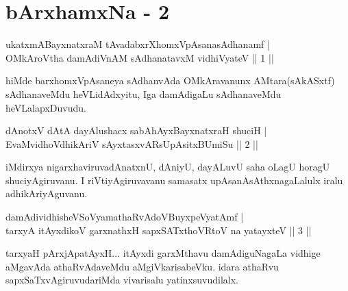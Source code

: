 
\chapter{bArxhamxNa - 2}
\begin{shl}
ukatxmABayxnatxraM tAvadabxrXhomxVpAsanasAdhanamf | \\
OMkAroV\s tha damAdiVnAM sAdhanatavxM vidhiVyateV \hfill||  1 || 
\end{shl}

\begin{artha}
hiMde barxhomxVpAsaneya sAdhanvAda OMkAravanunx AMtara(sAkASxtf) sAdhanaveMdu heVLidAdxyitu, Iga damAdigaLu sAdhanaveMdu heVLalapxDuvudu. 
\end{artha}


\begin{shl}
dAnotxV dAtA dayAlushacx sabAhAyxBayxnatxraH shuciH | \\
EvaMvidhoV\s dhikAriV sAyxtasxvARsUpAsitxBUmiSu \hfill||  2 ||
\end{shl}

\begin{artha}
iMdirxya nigarxhaviruvadAnatxnU, dAniyU, dayALuvU saha oLagU  horagU shuciyAgiruvanu. I riVtiyAgiruvavanu samasatx upAsanAsAthxnagaLalulx iralu adhikAriyAguvanu.
\end{artha}

\begin{shl}
damAdividhisheVSoV\s yamathaRvAdoV\s BuyxpeVyatAmf  | \\
 tarxyA itAyxdikoV garxnathxH sapxSATxthoVR\s toV na yatayxteV ||  3 || 
\end{shl}

\begin{artha}
tarxyaH pArxjApatAyxH... itAyxdi garxMthavu damAdiguNagaLa vidhige aMgavAda athaRvAdaveMdu aMgiVkarisabeVku. idara athaRvu sapxSaTxvAgiruvudariMda vivarisalu yatinxsuvudilalx.
\end{artha}

